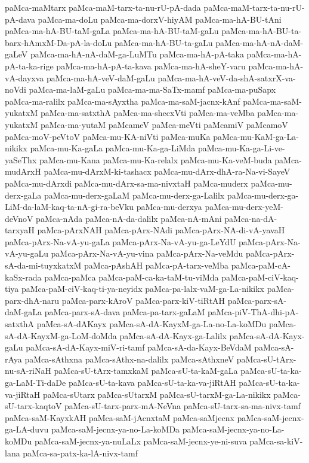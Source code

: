 {paMca-maMtarx
paMca-maM-tarx-ta-nu-rU-pA-dada
paMca-maM-tarx-ta-nu-rU-pA-dava
paMca-ma-doLu
paMca-ma-dorxV-hiyAM
paMca-ma-hA-BU-tAni
paMca-ma-hA-BU-taM-gaLa
paMca-ma-hA-BU-taM-gaLu
paMca-ma-hA-BU-ta-barx-hAmxM-Da-pA-la-doLu
paMca-ma-hA-BU-ta-gaLu
paMca-ma-hA-nA-daM-gaLeV
paMca-ma-hA-nA-daM-ga-LuMTu
paMca-ma-hA-pA-taka
paMca-ma-hA-pA-ta-ka-rige
paMca-ma-hA-pA-ta-kava
paMca-ma-hA-sheY-varu
paMca-ma-hA-vA-dayxva
paMca-ma-hA-veV-daM-gaLu
paMca-ma-hA-veV-da-shA-satxrX-va-noVdi
paMca-ma-laM-gaLu
paMca-ma-ma-SaTx-mamf
paMca-ma-puSapx
paMca-ma-ralilx
paMca-ma-sAyxtha
paMca-ma-saM-jacnx-kAnf
paMca-ma-saM-yukatxM
paMca-ma-satxthA
paMca-ma-shecxVti
paMca-ma-veMba
paMca-ma-yukatxM
paMca-ma-yutaM
paMcameV
paMca-meVti
paMcamiV
paMcamoV
paMca-moV-peVtoV
paMca-mu-KA-niVti
paMca-muKa
paMca-mu-KaM-ga-La-nikikx
paMca-mu-Ka-gaLa
paMca-mu-Ka-ga-LiMda
paMca-mu-Ka-ga-Li-ve-yaSeThx
paMca-mu-Kana
paMca-mu-Ka-relalx
paMca-mu-Ka-veM-buda
paMca-mudArxH
paMca-mu-dArxM-ki-tashacx
paMca-mu-dArx-dhA-ra-Na-vi-SayeV
paMca-mu-dArxdi
paMca-mu-dArx-sa-ma-nivxtaH
paMca-muderx
paMca-mu-derx-gaLa
paMca-mu-derx-gaLaM
paMca-mu-derx-ga-Lalilx
paMca-mu-derx-ga-LiM-da-laM-kaq-ta-nA-gi-ra-beVku
paMca-mu-derxya
paMca-mu-derx-yeM-deVnoV
paMca-nAda
paMca-nA-da-dalilx
paMca-nA-mAni
paMca-na-dA-tarxyaH
paMca-pArxNAH
paMca-pArx-NAdi
paMca-pArx-NA-di-vA-yavaH
paMca-pArx-Na-vA-yu-gaLa
paMca-pArx-Na-vA-yu-ga-LeYdU
paMca-pArx-Na-vA-yu-gaLu
paMca-pArx-Na-vA-yu-vina
paMca-pArx-Na-veMdu
paMca-pArx-sA-da-mi-tuyxkatxM
paMca-pAshAH
paMca-pA-tarx-veMba
paMca-paM-cA-kaSx-rada
paMca-paMca
paMca-paM-ca-ka-taM-tu-viMda
paMca-paM-ciV-kaq-tiya
paMca-paM-ciV-kaq-ti-ya-neyidx
paMca-pa-lalx-vaM-ga-La-nikikx
paMca-parx-dhA-naru
paMca-parx-kAroV
paMca-parx-kiV-tiRtAH
paMca-parx-sA-daM-gaLa
paMca-parx-sA-dava
paMca-pa-tarx-gaLaM
paMca-piV-ThA-dhi-pA-satxthA
paMca-sA-dAKayx
paMca-sA-dA-KayxM-ga-La-no-La-koMDu
paMca-sA-dA-KayxM-ga-LoM-doMda
paMca-sA-dA-Kayx-ga-Lalilx
paMca-sA-dA-Kayx-gaLu
paMca-sA-dA-Kayx-miV-ri-tamf
paMca-sA-da-Kayx-BeVdaM
paMca-sA-rAya
paMca-sAthxna
paMca-sAthx-na-dalilx
paMca-sAthxneV
paMca-sU-tArx-nu-sA-riNaH
paMca-sU-tArx-tamxkaM
paMca-sU-ta-kaM-gaLa
paMca-sU-ta-ka-ga-LaM-Ti-daDe
paMca-sU-ta-kava
paMca-sU-ta-ka-va-jiRtAH
paMca-sU-ta-ka-va-jiRtaH
paMca-sUtarx
paMca-sUtarxM
paMca-sU-tarxM-ga-La-nikikx
paMca-sU-tarx-kaqtoV
paMca-sU-tarx-parx-mA-NeVna
paMca-sU-tarx-sa-ma-nivx-tamf
paMca-saM-KayxkAH
paMca-saM-jAcnxtaM
paMca-saMjecnx
paMca-saM-jecnx-ga-LA-duvu
paMca-saM-jecnx-ya-no-La-koMDa
paMca-saM-jecnx-ya-no-La-koMDu
paMca-saM-jecnx-ya-nuLaLx
paMca-saM-jecnx-ye-ni-suva
paMca-sa-kiV-lana
paMca-sa-patx-ka-lA-nivx-tamf
}
